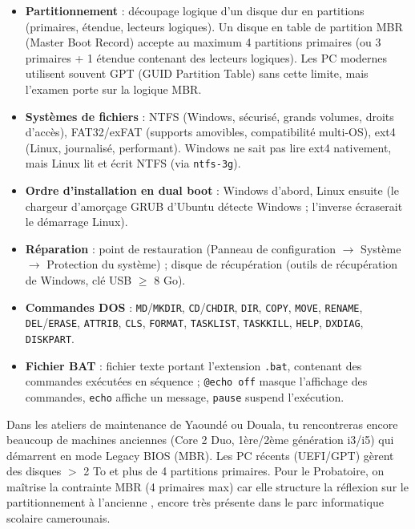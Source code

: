 \documentclass[11pt]{article}
\newcommand{\cle}[1]{{\popxbold\color{popdark}#1}}
\begin{document}
\begin{aretenir}
\begin{itemize}
  \item \textbf{Partitionnement} : découpage logique d'un disque dur en partitions (primaires, étendue, lecteurs logiques). Un disque en table de partition \cle{MBR} (Master Boot Record) accepte au maximum 4 partitions primaires (ou 3 primaires + 1 étendue contenant des lecteurs logiques). Les PC modernes utilisent souvent \cle{GPT} (GUID Partition Table) sans cette limite, mais l'examen porte sur la logique MBR.
  \item \textbf{Systèmes de fichiers} : \cle{NTFS} (Windows, sécurisé, grands volumes, droits d'accès), \cle{FAT32}/\cle{exFAT} (supports amovibles, compatibilité multi-OS), \cle{ext4} (Linux, journalisé, performant). Windows ne sait pas lire ext4 nativement, mais Linux lit et écrit NTFS (via \texttt{ntfs-3g}).
  \item \textbf{Ordre d'installation en dual boot} : Windows d'abord, Linux ensuite (le chargeur d'amorçage \cle{GRUB} d'Ubuntu détecte Windows ; l'inverse écraserait le démarrage Linux).
  \item \textbf{Réparation} : point de restauration (Panneau de configuration $\rightarrow$ Système $\rightarrow$ Protection du système) ; disque de récupération (outils de récupération de Windows, clé USB $\ge$ 8 Go).
  \item \textbf{Commandes DOS} : \texttt{MD}/\texttt{MKDIR}, \texttt{CD}/\texttt{CHDIR}, \texttt{DIR}, \texttt{COPY}, \texttt{MOVE}, \texttt{RENAME}, \texttt{DEL}/\texttt{ERASE}, \texttt{ATTRIB}, \texttt{CLS}, \texttt{FORMAT}, \texttt{TASKLIST}, \texttt{TASKKILL}, \texttt{HELP}, \texttt{DXDIAG}, \texttt{DISKPART}.
  \item \textbf{Fichier BAT} : fichier texte portant l'extension \texttt{.bat}, contenant des commandes exécutées en séquence ; \texttt{@echo off} masque l'affichage des commandes, \texttt{echo} affiche un message, \texttt{pause} suspend l'exécution.
\end{itemize}
\end{aretenir}

\begin{savaistu}
Dans les ateliers de maintenance de Yaoundé ou Douala, tu rencontreras encore beaucoup de machines anciennes (Core 2 Duo, 1ère/2ème génération i3/i5) qui démarrent en mode \cle{Legacy BIOS} (MBR). Les PC récents (UEFI/GPT) gèrent des disques $>$ 2 To et plus de 4 partitions primaires. Pour le Probatoire, on maîtrise la contrainte MBR (4 primaires max) car elle structure la réflexion sur le partitionnement \og à l'ancienne \fg, encore très présente dans le parc informatique scolaire camerounais.
\end{savaistu}
\end{document}
